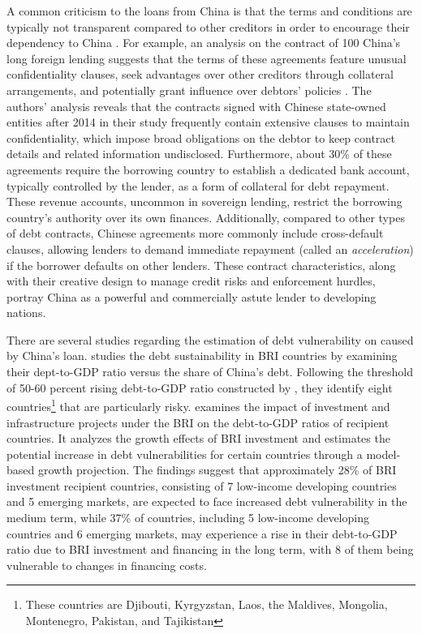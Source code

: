 A common criticism to the loans from China is that the terms and conditions are typically not transparent compared to other creditors in order to encourage their dependency to China \citep{tillerson2018us}. For example,
an analysis on the contract of 100 China's long foreign lending suggests that the terms of these agreements feature unusual confidentiality clauses, seek advantages over other creditors through collateral arrangements, and potentially grant influence over debtors' policies \citep{Gelpern-22}.
The authors' analysis reveals that the contracts signed with Chinese state-owned entities after 2014 in their study frequently contain extensive clauses to maintain confidentiality, which impose broad obligations on the debtor to keep contract details and related information undisclosed. Furthermore, about 30\% of these agreements require the borrowing country to establish a dedicated bank account, typically controlled by the lender, as a form of collateral for debt repayment. These revenue accounts, uncommon in sovereign lending, restrict the borrowing country's authority over its own finances. Additionally, compared to other types of debt contracts, Chinese agreements more commonly include cross-default clauses, allowing lenders to demand immediate repayment (called an \emph{acceleration}) if the borrower defaults on other lenders.
These contract characteristics, along with their creative design to manage credit risks and enforcement hurdles, portray China as a powerful and commercially astute lender to developing nations.

There are several studies regarding the estimation of debt vulnerability on caused by China's loan. \citet*{Hurley19-8-debt-trap} studies the debt sustainability in BRI countries by examining their dept-to-GDP ratio versus the share of China's debt. Following the threshold of 50-60 percent rising debt-to-GDP ratio constructed by \citet{Chudik-15}, they identify eight
countries\footnote{
    These countries are Djibouti, Kyrgyzstan, Laos, the Maldives, Mongolia, Montenegro, Pakistan, and Tajikistan}
that are particularly risky.
\citet*{Bandiera-Vasileios-BRI-debt} examines the impact of investment and infrastructure projects under the BRI on the debt-to-GDP ratios of recipient countries. It analyzes the growth effects of BRI investment and estimates the potential increase in debt vulnerabilities for certain countries through a model-based growth projection. The findings suggest that approximately 28\% of BRI investment recipient countries, consisting of 7 low-income developing countries and 5 emerging markets, are expected to face increased debt vulnerability in the medium term, while 37\% of countries, including 5 low-income developing countries and 6 emerging markets, may experience a rise in their debt-to-GDP ratio due to BRI investment and financing in the long term, with 8 of them being vulnerable to changes in financing costs.


